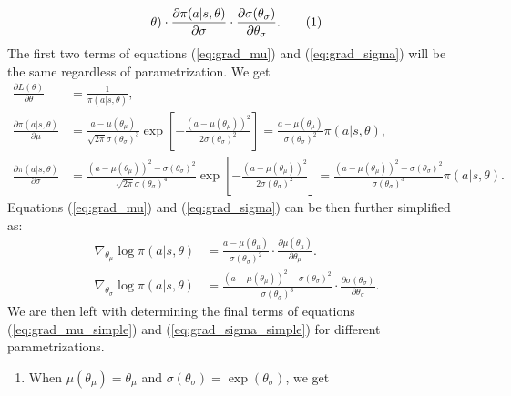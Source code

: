 \documentclass{article}
\newcommand\numberthis{\addtocounter{equation}{1}\tag{\theequation}}
\begin{document}
\begin{enumerate}
\begin{align*}
{			      \theta)} \cdot \frac{\partial \pi(a|s,\theta)}{\partial \sigma} \cdot
		      \frac{\partial{\sigma(\theta_\sigma)}}{\partial \theta_\sigma}. \numberthis \label{eq:grad_sigma}
	      \end{align*}
	      The first two terms of equations (\ref{eq:grad_mu}) and (\ref{eq:grad_sigma}) will be the
	      same regardless of parametrization. We get
	      \begin{align}
		      \frac{\partial L(\theta)}{\partial \theta} & = \frac{1}{\pi(a|s,\theta)} \label{eq:dl_dpi},
		      \\ \frac{\partial \pi(a|s,\theta)}{\partial \mu}    & = \frac{a-\mu(\theta_\mu)}{\sqrt{2
				      \pi } \sigma(\theta_\sigma) ^3} \exp\left[-\frac{(a-\mu(\theta_\mu))^2}{2
				      \sigma(\theta_\sigma) ^2}\right] = \frac{a
			      - \mu(\theta_\mu)}{\sigma(\theta_\sigma)^2} \pi(a|s,\theta), \label{eq:dpi_dmu}
		      \\ \frac{\partial \pi(a|s,\theta)}{\partial \sigma} & = \frac{
			      (a-\mu(\theta_\mu))^2-\sigma(\theta_\sigma) ^2}{\sqrt{2 \pi } \sigma(\theta_\sigma) ^4}
		      \exp\left[-\frac{(a-\mu(\theta_\mu) )^2}{2 \sigma(\theta_\sigma) ^2}\right] = \frac{
			      (a-\mu(\theta_\mu))^2-\sigma(\theta_\sigma) ^2}{\sigma(\theta_\sigma)^3}
		      \pi(a|s,\theta).\label{eq:dpi_dsigma}
	      \end{align}
	      Equations (\ref{eq:grad_mu}) and (\ref{eq:grad_sigma}) can be then further simplified as:
	      \begin{align}
		      \nabla_{\theta_\mu} \log \pi(a|s, \theta)    & = \frac{a
			      - \mu(\theta_\mu)}{\sigma(\theta_\sigma)^2} \cdot
		      \frac{\partial{\mu(\theta_\mu)}}{\partial \theta_\mu}. \label{eq:grad_mu_simple} \\
		      \nabla_{\theta_\sigma} \log \pi(a|s, \theta) & = \frac{
			      (a-\mu(\theta_\mu))^2-\sigma(\theta_\sigma) ^2}{\sigma(\theta_\sigma)^3}\cdot
		      \frac{\partial{\sigma(\theta_\sigma)}}{\partial \theta_\sigma}.
		      \label{eq:grad_sigma_simple}
	      \end{align}
	      We are then left with determining the final terms of equations (\ref{eq:grad_mu_simple}) and
	      (\ref{eq:grad_sigma_simple}) for different parametrizations.
	      \begin{enumerate}
		      \item When $\mu(\theta_\mu) = \theta_\mu$ and $\sigma(\theta_\sigma) = \exp(\theta_\sigma)$, we
		            get
		            \begin{align}

\end{align}
\end{enumerate}
\end{enumerate}
\end{document}
